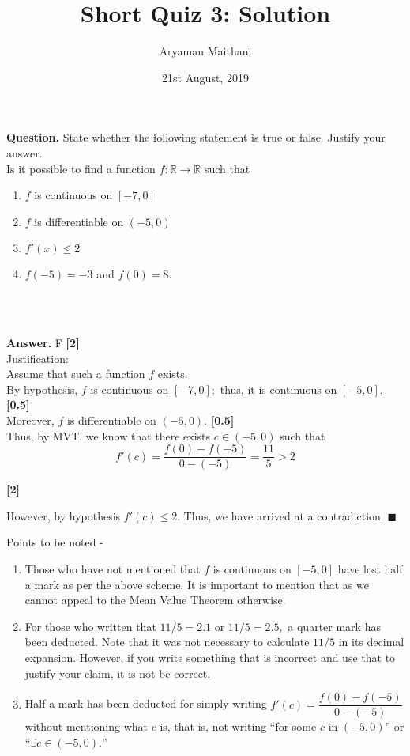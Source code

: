 \documentclass{article}
\title{Short Quiz 3: Solution}      %
\author{Aryaman Maithani}
\date{21st August, 2019}			 %
\begin{document}
\maketitle

\hrulefill

\textbf{Question.} State whether the following statement is true or false. Justify your answer.\\
Is it possible to find a function $f : \mathbb{R} \to \mathbb{R}$ such that
\begin{enumerate}[label = (\alph*)]
	\item $f$ is continuous on $[-7, 0]$
	\item $f$ is differentiable on $(-5, 0)$
	\item $f'(x) \le 2$
	\item $f(-5) = -3$ and $f(0) = 8.$
\end{enumerate}
\begin{flushright}
	\\~\\
\end{flushright}

\hrulefill

\textbf{Answer.} F \hfill \textbf{[2]}\\  %
Justification: \\
Assume that such a function $f$ exists.\\
By hypothesis, $f$ is continuous on $[-7, 0];$ thus, it is continuous on $[-5, 0].$ \hfill \textbf{[0.5]}\\
Moreover, $f$ is differentiable on $(-5, 0).$ \hfill \textbf{[0.5]}\\
Thus, by MVT, we know that there exists $c \in (-5, 0)$ such that
\[f'(c) = \dfrac{f(0) - f(-5)}{0 - (-5)} = \dfrac{11}{5} > 2\]
\begin{flushright}
	\textbf{[2]}
\end{flushright}	
However, by hypothesis $f'(c) \le 2.$ Thus, we have arrived at a contradiction. \hfill $\blacksquare$\\

\hrulefill

\vspace{0.2 cm}

Points to be noted -
\begin{enumerate} 
	\item Those who have not mentioned that $f$ is continuous on $[-5, 0]$ have lost half a mark as per the above scheme. It is important to mention that as we cannot appeal to the Mean Value Theorem otherwise.
	\item For those who written that $11/5 = 2.1$ or $11/5 = 2.5,$ a quarter mark has been deducted. Note that it was not necessary to calculate $11/5$ in its decimal expansion. However, if you write something that is incorrect and use that to justify your claim, it is not be correct.
	\item Half a mark has been deducted for simply writing $f'(c) = \dfrac{f(0) - f(-5)}{0 - (-5)}$ without mentioning what $c$ is, that is, not writing ``for some $c$ in $(-5, 0)$'' or ``$\exists c \in (-5, 0).$''
\end{enumerate}
\end{document}
